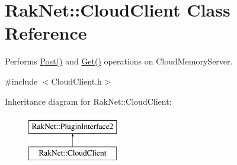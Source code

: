 \hypertarget{class_rak_net_1_1_cloud_client}{\section{Rak\-Net\-:\-:Cloud\-Client Class Reference}
\label{class_rak_net_1_1_cloud_client}
}


Performs \hyperlink{class_rak_net_1_1_cloud_client_aa561b024fd2f02c7f19c1cc36cfd2382}{Post()} and \hyperlink{class_rak_net_1_1_cloud_client_a97bcdfb7e824f979efa7491d3c837204}{Get()} operations on Cloud\-Memory\-Server.  




{\ttfamily \#include $<$Cloud\-Client.\-h$>$}

Inheritance diagram for Rak\-Net\-:\-:Cloud\-Client\-:\begin{figure}[H]
\begin{center}
\leavevmode
\includegraphics[height=2.000000cm]{class_rak_net_1_1_cloud_client}
\end{center}
\end{figure}
